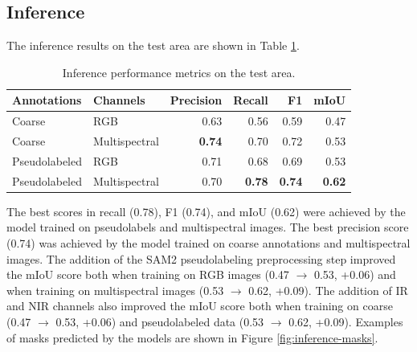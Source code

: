 \documentclass[english, 12pt, a4paper, sci, utf8, a-2b, online]{aaltothesis}
\begin{document}
\subsection{Inference}

The inference results on the test area are shown in Table \ref{table:results}.

\begin{table}[h]
    \centering
    \begin{tabular}{llrrrr}
    Annotations & Channels & Precision & Recall & F1 & mIoU \\
    \hline
    Coarse & RGB & 0.63 & 0.56 & 0.59 & 0.47 \\
    Coarse & Multispectral & \textbf{0.74} & 0.70 & 0.72 & 0.53 \\
    Pseudolabeled & RGB & 0.71 & 0.68 & 0.69 & 0.53 \\
    Pseudolabeled & Multispectral & 0.70 & \textbf{0.78} & \textbf{0.74} & \textbf{0.62} \\
    \end{tabular}
    \caption{Inference performance metrics on the test area.}
    \label{table:results}
\end{table}

The best scores in recall (0.78), F1 (0.74), and mIoU (0.62) were achieved by the model trained on pseudolabels and multispectral images. The best precision score (0.74) was achieved by the model trained on coarse annotations and multispectral images. The addition of the SAM2 pseudolabeling preprocessing step improved the mIoU score both when training on RGB images (0.47 $\rightarrow$ 0.53, +0.06) and when training on multispectral images (0.53 $\rightarrow$ 0.62, +0.09). The addition of IR and NIR channels also improved the mIoU score both when training on coarse (0.47 $\rightarrow$ 0.53, +0.06) and pseudolabeled data (0.53 $\rightarrow$ 0.62, +0.09).
Examples of masks predicted by the models are shown in Figure \ref{fig:inference-masks}.
\end{document}
